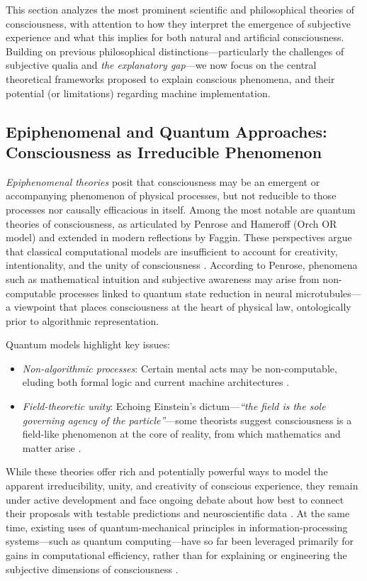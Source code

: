 This section analyzes the most prominent scientific and philosophical theories of consciousness, with attention to how they interpret the emergence of subjective experience and what this implies for both natural and artificial consciousness. Building on previous philosophical distinctions---particularly the challenges of subjective qualia and \emph{the explanatory gap}---we now focus on the central theoretical frameworks proposed to explain conscious phenomena, and their potential (or limitations) regarding machine implementation.

\subsection{Epiphenomenal and Quantum Approaches: Consciousness as Irreducible Phenomenon}

\emph{Epiphenomenal theories} posit that consciousness may be an emergent or accompanying phenomenon of physical processes, but not reducible to those processes nor causally efficacious in itself. Among the most notable are quantum theories of consciousness, as articulated by Penrose and Hameroff (Orch OR model) and extended in modern reflections by Faggin. These perspectives argue that classical computational models are insufficient to account for creativity, intentionality, and the unity of consciousness \cite{faggin2024irreducible,hameroff2014consciousness,penrose1990emperors}. According to Penrose, phenomena such as mathematical intuition and subjective awareness may arise from non-computable processes linked to quantum state reduction in neural microtubules---a viewpoint that places consciousness at the heart of physical law, ontologically prior to algorithmic representation.

Quantum models highlight key issues:

\begin{itemize}
\item \emph{Non-algorithmic processes}: Certain mental acts may be non-computable, eluding both formal logic and current machine architectures \cite{penrose1990emperors}.
\item \emph{Field-theoretic unity}: Echoing Einstein's dictum---\emph{``the field is the sole governing agency of the particle''}---some theorists suggest consciousness is a field-like phenomenon at the core of reality, from which mathematics and matter arise \cite{faggin2024irreducible}.
\end{itemize}

While these theories offer rich and potentially powerful ways to model the apparent irreducibility, unity, and creativity of conscious experience, they remain under active development and face ongoing debate about how best to connect their proposals with testable predictions and neuroscientific data \cite{garridomerchan2024machine}. At the same time, existing uses of quantum-mechanical principles in information-processing systems---such as quantum computing---have so far been leveraged primarily for gains in computational efficiency, rather than for explaining or engineering the subjective dimensions of consciousness \cite{qin2025taxonomy}.

